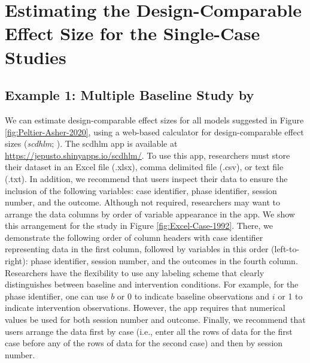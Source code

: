 \documentclass[
]{book}
\begin{document}
\hypertarget{estimating-the-design-comparable-effect-size-for-the-single-case-studies}{%
\section{Estimating the Design-Comparable Effect Size for the Single-Case Studies}\label{estimating-the-design-comparable-effect-size-for-the-single-case-studies}}

\hypertarget{example-1-multiple-baseline-study-by-case1992improving}{%
\subsection{\texorpdfstring{Example 1: Multiple Baseline Study by \citet{case1992Improving}}{Example 1: Multiple Baseline Study by @case1992Improving}}\label{example-1-multiple-baseline-study-by-case1992improving}}

We can estimate design-comparable effect sizes for all models suggested in Figure \ref{fig:Peltier-Asher-2020}, using a web-based calculator for design-comparable effect sizes (\emph{scdhlm}; \citet{pustejovsky2021scdhlm}). The scdhlm app is available at \url{https://jepusto.shinyapps.io/scdhlm/}. To use this app, researchers must store their dataset in an Excel file (.xlsx), comma delimited file (.csv), or text file (.txt). In addition, we recommend that users inspect their data to ensure the inclusion of the following variables: case identifier, phase identifier, session number, and the outcome. Although not required, researchers may want to arrange the data columns by order of variable appearance in the app.
We show this arrangement for the \citet{case1992Improving} study in Figure \ref{fig:Excel-Case-1992}. There, we demonstrate the following order of column headers with case identifier representing data in the first column, followed by variables in this order (left-to-right): phase identifier, session number, and the outcomes in the fourth column. Researchers have the flexibility to use any labeling scheme that clearly distinguishes between baseline and intervention conditions. For example, for the phase identifier, one can use \(b\) or 0 to indicate baseline observations and \(i\) or 1 to indicate intervention observations. However, the app requires that numerical values be used for both session number and outcome. Finally, we recommend that users arrange the data first by case (i.e., enter all the rows of data for the first case before any of the rows of data for the second case) and then by session number.
\end{document}
